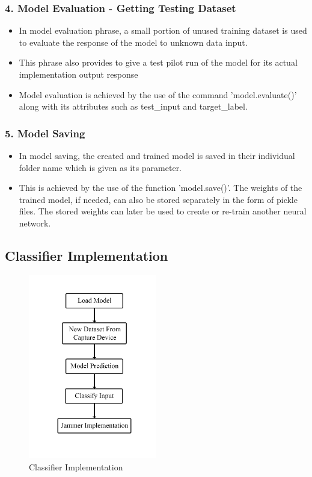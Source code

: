\subsubsection*{4. Model Evaluation - Getting Testing Dataset}
\begin{itemize}
  \item In model evaluation phrase, a small portion of unused training dataset is used to evaluate the response of the model to unknown data input.
  \item This phrase also provides to give a test pilot run of the model for its actual implementation output response
  \item Model evaluation is achieved by the use of the command 'model.evaluate()' along with its attributes such as test\_input and target\_label.
\end{itemize}

\subsubsection*{5. Model Saving}
\begin{itemize}
  \item   In model saving, the created and trained model is saved in their individual folder name which is given as its parameter.
  \item   This is achieved by the use of the function 'model.save()'. The weights of the trained model, if needed, can also be stored separately in the form of pickle files. The stored weights can later be used to create or re-train another neural network.
\end{itemize}

\subsection{Classifier Implementation}
\begin{figure}[H]
  \centering
  \includegraphics[width=0.5\textwidth]{ Model implementation.png }
  \caption{Classifier Implementation}

\end{figure}
